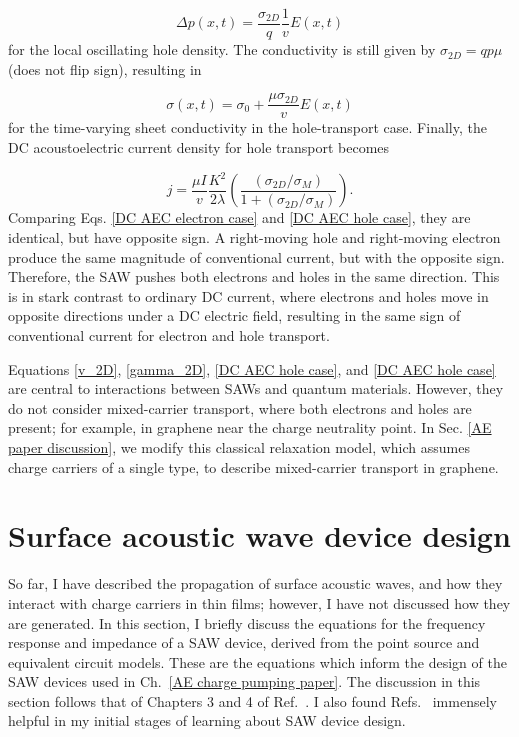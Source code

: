 \documentclass[double,12pt,1in,seploa]{beavtex}
\let\Oldsection\section
\renewcommand{\section}{\FloatBarrier\Oldsection}
\begin{document}
\begin{equation}
    \Delta p(x,t) = \frac{\sigma_{2D}}{q} \frac{1}{v}E(x,t)
\end{equation}
for the local oscillating hole density. The conductivity is still given by $\sigma_{2D} = q p \mu$ (does not flip sign), resulting in

\begin{equation}
    \sigma(x,t)= \sigma_0 + \frac{\mu \sigma_{2D}}{v}E(x,t)
\end{equation}
for the time-varying sheet conductivity in the hole-transport case. Finally, the DC acoustoelectric current density for hole transport becomes

\begin{equation}
    j = \frac{\mu I}{v} \frac{K^2}{2\lambda}(\frac{(\sigma_{2D}/\sigma_M)}{1+(\sigma_{2D}/\sigma_M)}). \label{DC AEC hole case}
\end{equation}
Comparing Eqs. \ref{DC AEC electron case} and \ref{DC AEC hole case}, they are identical, but have opposite sign. A right-moving hole and right-moving electron produce the same magnitude of conventional current, but with the opposite sign. Therefore, the SAW pushes both electrons and holes in the same direction. This is in stark contrast to ordinary DC current, where electrons and holes move in opposite directions under a DC electric field, resulting in the same sign of conventional current for electron and hole transport.

Equations \ref{v_2D}, \ref{gamma_2D}, \ref{DC AEC hole case}, and \ref{DC AEC hole case} are central to interactions between SAWs and quantum materials. However, they do not consider mixed-carrier transport, where both electrons and holes are present; for example, in graphene near the charge neutrality point. In Sec. \ref{AE paper discussion}, we modify this classical relaxation model, which assumes charge carriers of a single type, to describe mixed-carrier transport in graphene.


\section{Surface acoustic wave device design} \label{SAW device design}

So far, I have described the propagation of surface acoustic waves, and how they interact with charge carriers in thin films; however, I have not discussed how they are generated. In this section, I briefly discuss the equations for the frequency response and impedance of a SAW device, derived from the point source and equivalent circuit models. These are the equations which inform the design of the SAW devices used in Ch.\ \ref{AE charge pumping paper}. The discussion in this section follows that of Chapters 3 and 4 of Ref.\ \cite{campbell_surface_1989}. I also found Refs.\ \cite{datta_surface_1986,lane_integrating_2021} immensely helpful in my initial stages of learning about SAW device design.
\end{document}
